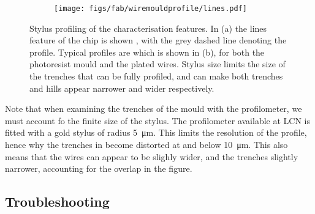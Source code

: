 \begin{figure}[h]
  \centering
  \begin{subfigure}[b]{0.3\textwidth}
    \texttt{[image: figs/fab/wiremouldprofile/lines.pdf]}
    \vspace{1cm}
    \caption{}
  \end{subfigure}
  \hspace{1cm}
  \begin{subfigure}[b]{0.55\textwidth}
    \caption{}
  \end{subfigure}
  \caption{Stylus profiling of the characterisation features. In (a) the lines
  feature of the chip is shown , with the grey
  dashed line denoting the profile. Typical profiles are which is shown in (b),
  for both the photoresist mould and the plated wires. Stylus size limits the
  size of the trenches that can be fully profiled, and can make both trenches
  and hills appear narrower and wider respectively.
  }
  \label{fab:fig:chipprofile}
\end{figure}

Note that when examining the trenches of the mould with the profilometer, we
must account fo the finite size of the stylus.
The profilometer available at LCN is fitted with a gold stylus of radius
\SI{5}{\micro\meter}. This limits the resolution of the profile, hence why the
trenches in  become distorted at and below
\SI{10}{\micro\meter}. This also means that the wires can appear to be slighly
wider, and the trenches slightly narrower, accounting for the overlap in the
figure.

\subsection{Troubleshooting}

